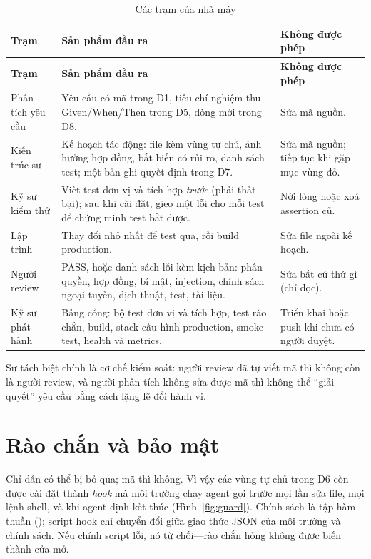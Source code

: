 \documentclass[../main.tex]{subfiles}
\begin{document}
\begin{longtable}{|p{2.6cm}|p{6.4cm}|p{4.9cm}|}
\caption{Các trạm của nhà máy}\label{tab:stations}\\
\hline
\textbf{Trạm} & \textbf{Sản phẩm đầu ra} & \textbf{Không được phép} \\ \hline
\endfirsthead
\hline
\textbf{Trạm} & \textbf{Sản phẩm đầu ra} & \textbf{Không được phép} \\ \hline
\endhead
Phân tích yêu cầu & Yêu cầu có mã trong D1, tiêu chí nghiệm thu Given/When/Then trong D5, dòng mới trong D8. & Sửa mã nguồn. \\ \hline
Kiến trúc sư & Kế hoạch tác động: file kèm vùng tự chủ, ảnh hưởng hợp đồng, bất biến có rủi ro, danh sách test; một bản ghi quyết định trong D7. & Sửa mã nguồn; tiếp tục khi gặp mục vùng đỏ. \\ \hline
Kỹ sư kiểm thử & Viết test đơn vị và tích hợp \emph{trước} (phải thất bại); sau khi cài đặt, gieo một lỗi cho mỗi test để chứng minh test bắt được. & Nới lỏng hoặc xoá assertion cũ. \\ \hline
Lập trình & Thay đổi nhỏ nhất để test qua, rồi build production. & Sửa file ngoài kế hoạch. \\ \hline
Người review & PASS, hoặc danh sách lỗi kèm kịch bản: phân quyền, hợp đồng, bí mật, injection, chính sách ngoại tuyến, dịch thuật, test, tài liệu. & Sửa bất cứ thứ gì (chỉ đọc). \\ \hline
Kỹ sư phát hành & Bảng cổng: bộ test đơn vị và tích hợp, test rào chắn, build, stack cấu hình production, smoke test, health và metrics. & Triển khai hoặc push khi chưa có người duyệt. \\ \hline
\end{longtable}

Sự tách biệt chính là cơ chế kiểm soát: người review đã tự viết mã thì không còn là người review, và
người phân tích không sửa được mã thì không thể ``giải quyết'' yêu cầu bằng cách lặng lẽ đổi hành vi.

\section{Rào chắn và bảo mật}
Chỉ dẫn có thể bị bỏ qua; mã thì không. Vì vậy các vùng tự chủ trong D6 còn được cài đặt thành
\emph{hook} mà môi trường chạy agent gọi trước mọi lần sửa file, mọi lệnh shell, và khi agent định
kết thúc (Hình~\ref{fig:guard}). Chính sách là tập hàm thuần (); script
hook chỉ chuyển đổi giữa giao thức JSON của môi trường và chính sách. Nếu chính script lỗi, nó từ
chối---rào chắn hỏng không được biến thành cửa mở.
\end{document}
